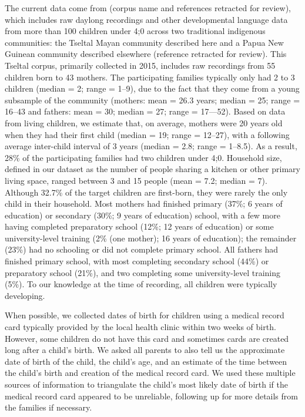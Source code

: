 \documentclass[floatsintext,man]{apa6}
\theoremstyle{definition}
\theoremstyle{definition}
\theoremstyle{definition}
\theoremstyle{remark}
\begin{document}
The current data come from (corpus name and references retracted for
review), which includes raw daylong recordings and other developmental
language data from more than 100 children under 4;0 across two
traditional indigenous communities: the Tseltal Mayan community
described here and a Papua New Guinean community described elsewhere
(reference retracted for review). This Tseltal corpus, primarily
collected in 2015, includes raw recordings from 55 children born to 43
mothers. The participating families typically only had 2 to 3 children
(median = 2; range = 1--9), due to the fact that they come from a young
subsample of the community (mothers: mean = 26.3 years; median = 25;
range = 16--43 and fathers: mean = 30; median = 27; range = 17---52).
Based on data from living children, we estimate that, on average,
mothers were 20 years old when they had their first child (median = 19;
range = 12--27), with a following average inter-child interval of 3
years (median = 2.8; range = 1--8.5). As a result, 28\% of the
participating families had two children under 4;0. Household size,
defined in our dataset as the number of people sharing a kitchen or
other primary living space, ranged between 3 and 15 people (mean = 7.2;
median = 7). Although 32.7\% of the target children are first-born, they
were rarely the only child in their household. Most mothers had finished
primary (37\%; 6 years of education) or secondary (30\%; 9 years of
education) school, with a few more having completed preparatory school
(12\%; 12 years of education) or some university-level training (2\%
(one mother); 16 years of education); the remainder (23\%) had no
schooling or did not complete primary school. All fathers had finished
primary school, with most completing secondary school (44\%) or
preparatory school (21\%), and two completing some university-level
training (5\%). To our knowledge at the time of recording, all children
were typically developing.

When possible, we collected dates of birth for children using a medical
record card typically provided by the local health clinic within two
weeks of birth. However, some children do not have this card and
sometimes cards are created long after a child's birth. We asked all
parents to also tell us the approximate date of birth of the child, the
child's age, and an estimate of the time between the child's birth and
creation of the medical record card. We used these multiple sources of
information to triangulate the child's most likely date of birth if the
medical record card appeared to be unreliable, following up for more
details from the families if necessary.
\end{document}
